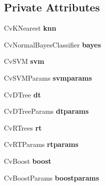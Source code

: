 \subsection*{Private Attributes}
\begin{DoxyCompactItemize}
\item 
\hypertarget{class_m_l_alg_af8bcdfcf8875738e5a223ce1d2b733ce}{Cv\-K\-Nearest {\bfseries knn}}\label{class_m_l_alg_af8bcdfcf8875738e5a223ce1d2b733ce}

\item 
\hypertarget{class_m_l_alg_ada96139781f275d06c037aaa1a56f89c}{Cv\-Normal\-Bayes\-Classifier {\bfseries bayes}}\label{class_m_l_alg_ada96139781f275d06c037aaa1a56f89c}

\item 
\hypertarget{class_m_l_alg_a89bf01fc27eb09936437aeb06aba1245}{Cv\-S\-V\-M {\bfseries svm}}\label{class_m_l_alg_a89bf01fc27eb09936437aeb06aba1245}

\item 
\hypertarget{class_m_l_alg_aa2d51dc23079b08c7596edadfd405126}{Cv\-S\-V\-M\-Params {\bfseries svmparams}}\label{class_m_l_alg_aa2d51dc23079b08c7596edadfd405126}

\item 
\hypertarget{class_m_l_alg_a08428a16d0fca701be9d039e82678d44}{Cv\-D\-Tree {\bfseries dt}}\label{class_m_l_alg_a08428a16d0fca701be9d039e82678d44}

\item 
\hypertarget{class_m_l_alg_a745160bb70856bd038a5483cd820fa1b}{Cv\-D\-Tree\-Params {\bfseries dtparams}}\label{class_m_l_alg_a745160bb70856bd038a5483cd820fa1b}

\item 
\hypertarget{class_m_l_alg_ab90889f7a4f9545a9e2aa3136a52e1cd}{Cv\-R\-Trees {\bfseries rt}}\label{class_m_l_alg_ab90889f7a4f9545a9e2aa3136a52e1cd}

\item 
\hypertarget{class_m_l_alg_a274170d71d4a78ae53106008112b397d}{Cv\-R\-T\-Params {\bfseries rtparams}}\label{class_m_l_alg_a274170d71d4a78ae53106008112b397d}

\item 
\hypertarget{class_m_l_alg_ae29c03c54a7730fdc4dfd0a5444aacb6}{Cv\-Boost {\bfseries boost}}\label{class_m_l_alg_ae29c03c54a7730fdc4dfd0a5444aacb6}

\item 
\hypertarget{class_m_l_alg_a5381eac6f165bca57c94006eacc1ecbf}{Cv\-Boost\-Params {\bfseries boostparams}}\label{class_m_l_alg_a5381eac6f165bca57c94006eacc1ecbf}


\end{DoxyCompactItemize}
